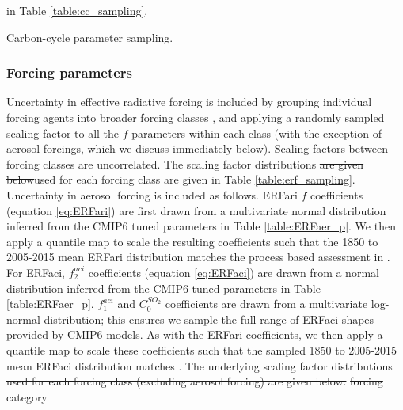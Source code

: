 \documentclass[gmd, manuscript]{copernicus}
\providecommand{\DIFadd}[1]{{\protect\color{blue}#1}} %
\providecommand{\DIFdel}[1]{{\protect\color{red}\sout{#1}}}                      %
\providecommand{\DIFaddbegin}{} %
\providecommand{\DIFaddend}{} %
\providecommand{\DIFdelbegin}{} %
\providecommand{\DIFdelend}{} %
\providecommand{\DIFaddFL}[1]{\DIFadd{#1}} %
\begin{document}
\DIFdelend \DIFaddbegin \DIFadd{in Table \ref{table:cc_sampling}.
}\begin{table}[h]
    \caption{\DIFaddFL{Carbon-cycle parameter sampling.}}
    \label{table:cc_sampling}
    
\end{table}
\clearpage
\DIFaddend \subsubsection{Forcing parameters} \label{forcing_sampling}
Uncertainty in effective radiative forcing is included by grouping individual forcing agents into broader forcing classes \citep{IPCC2013f}, and applying a randomly sampled scaling factor to all the $f$ parameters within each class (with the exception of aerosol forcings, which we discuss \DIFaddbegin \DIFadd{immediately }\DIFaddend below). Scaling factors between forcing classes are uncorrelated. The scaling factor distributions \DIFdelbegin \DIFdel{are given below}\DIFdelend \DIFaddbegin \DIFadd{used for each forcing class are given in Table \ref{table:erf_sampling}}\DIFaddend . Uncertainty in aerosol forcing is included as follows. ERFari $f$ coefficients (equation \ref{eq:ERFari}) are first drawn from a multivariate normal distribution inferred from the CMIP6 tuned parameters in \DIFaddbegin \DIFadd{Table }\DIFaddend \ref{table:ERFaer_p}. We then apply a quantile map to scale the resulting coefficients such that the 1850 to 2005-2015 mean ERFari distribution matches the process based assessment in \cite{Bellouin}. For ERFaci, $f_2^{aci}$ coefficients (equation \ref{eq:ERFaci}) are drawn from a normal distribution inferred from the CMIP6 tuned parameters in \DIFaddbegin \DIFadd{Table }\DIFaddend \ref{table:ERFaer_p}. $f_1^{aci}$ and $C_0^{SO_2}$ coefficients are drawn from a multivariate log-normal distribution; this ensures we sample the full range of ERFaci shapes provided by CMIP6 models. As with the ERFari coefficients, we then apply a quantile map to scale these coefficients such that the sampled 1850 to 2005-2015 mean ERFaci distribution matches \citet{Bellouin}.
\DIFdelbegin \DIFdel{The underlying scaling factor distributions used for each forcing class (excluding aerosol forcing) are given below.}%
\DIFdel{forcing category}%
\end{document}
